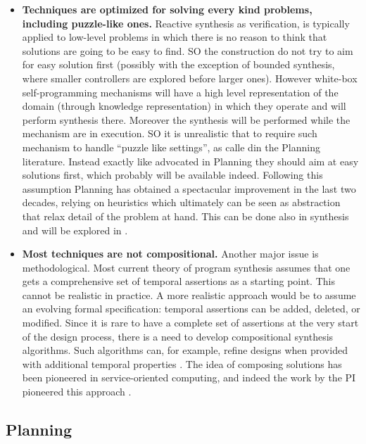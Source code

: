 \begin{itemize}
\item \textbf{Techniques are optimized for solving every kind problems, including puzzle-like ones.}
Reactive synthesis as verification, is typically applied to low-level
problems in which there is no reason to think that solutions are going
to be easy to find. SO the construction do not try to aim for easy
solution first (possibly with the exception of bounded synthesis,
where smaller controllers are explored before larger ones).  However
white-box self-programming mechanisms will have a high level
representation of the domain (through knowledge representation) in
which they operate and will perform synthesis there. Moreover the
synthesis will be performed while the mechanism are in execution. SO
it is unrealistic that to require such mechanism to handle ``puzzle
like settings'', as calle din the Planning literature. Instead exactly
like advocated in Planning they should aim at easy solutions first,
which probably will be available indeed. Following this assumption
Planning has obtained a spectacular improvement in the last two
decades, relying on heuristics which ultimately can be seen as
abstraction that relax detail of the problem at hand. This can be done
also in synthesis and will be explored in \project.



\item \textbf{Most techniques are not compositional.}
Another major issue is methodological. Most current theory of program
synthesis assumes that one gets a comprehensive set of temporal
assertions as a starting point. This cannot be realistic in
practice. A more realistic approach would be to assume an evolving
formal specification: temporal assertions can be added, deleted, or
modified. Since it is rare to have a complete set of assertions at the
very start of the design process, there is a need to develop
compositional synthesis algorithms. Such algorithms can, for example,
refine designs when provided with additional temporal properties
\cite{KupfermanPV06,FiliotJR11,AlurMT16}. The idea of composing solutions has been pioneered in
service-oriented computing, and indeed the work by the PI pioneered
this approach \cite{BerardiCGLM03,DeGiacomoFPS10,DePS13,CalvaneseGLV16}.
\end{itemize}

\subsection{Planning}


